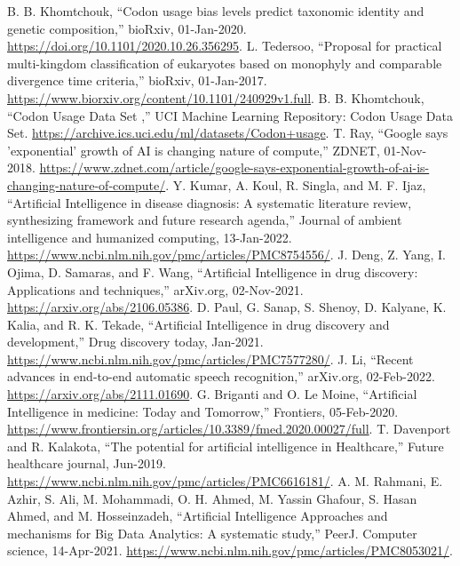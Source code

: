 \documentclass[conference]{IEEEtran}
\begin{document}
\begin{thebibliography}{00}

 B. B. Khomtchouk, “Codon usage bias levels predict taxonomic identity and genetic composition,” bioRxiv, 01-Jan-2020. \url{https://doi.org/10.1101/2020.10.26.356295}. 
 L. Tedersoo, “Proposal for practical multi-kingdom classification of eukaryotes based on monophyly and comparable divergence time criteria,” bioRxiv, 01-Jan-2017. \url{https://www.biorxiv.org/content/10.1101/240929v1.full}.
 B. B. Khomtchouk, “Codon Usage Data Set ,” UCI Machine Learning Repository: Codon Usage Data Set. \url{https://archive.ics.uci.edu/ml/datasets/Codon+usage}. 
 T. Ray, “Google says 'exponential' growth of AI is changing nature of compute,” ZDNET, 01-Nov-2018. \url{https://www.zdnet.com/article/google-says-exponential-growth-of-ai-is-changing-nature-of-compute/}. 
 Y. Kumar, A. Koul, R. Singla, and M. F. Ijaz, “Artificial Intelligence in disease diagnosis: A systematic literature review, synthesizing framework and future research agenda,” Journal of ambient intelligence and humanized computing, 13-Jan-2022. \url{https://www.ncbi.nlm.nih.gov/pmc/articles/PMC8754556/}. 
 J. Deng, Z. Yang, I. Ojima, D. Samaras, and F. Wang, “Artificial Intelligence in drug discovery: Applications and techniques,” arXiv.org, 02-Nov-2021. \url{https://arxiv.org/abs/2106.05386}. 
 D. Paul, G. Sanap, S. Shenoy, D. Kalyane, K. Kalia, and R. K. Tekade, “Artificial Intelligence in drug discovery and development,” Drug discovery today, Jan-2021. \url{https://www.ncbi.nlm.nih.gov/pmc/articles/PMC7577280/}. 
 J. Li, “Recent advances in end-to-end automatic speech recognition,” arXiv.org, 02-Feb-2022. \url{https://arxiv.org/abs/2111.01690}. 
 G. Briganti and O. Le Moine, “Artificial Intelligence in medicine: Today and Tomorrow,” Frontiers, 05-Feb-2020. \url{https://www.frontiersin.org/articles/10.3389/fmed.2020.00027/full}. 
 T. Davenport and R. Kalakota, “The potential for artificial intelligence in Healthcare,” Future healthcare journal, Jun-2019. \url{https://www.ncbi.nlm.nih.gov/pmc/articles/PMC6616181/}. 
 A. M. Rahmani, E. Azhir, S. Ali, M. Mohammadi, O. H. Ahmed, M. Yassin Ghafour, S. Hasan Ahmed, and M. Hosseinzadeh, “Artificial Intelligence Approaches and mechanisms for Big Data Analytics: A systematic study,” PeerJ. Computer science, 14-Apr-2021. \url{https://www.ncbi.nlm.nih.gov/pmc/articles/PMC8053021/}. 

\end{thebibliography}
\end{document}
